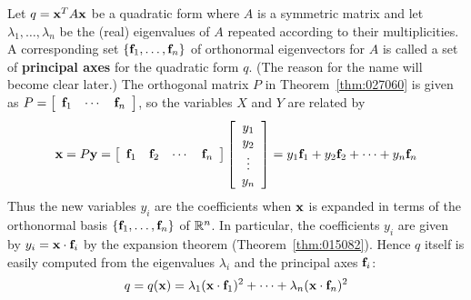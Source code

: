 Let $q = \textbf{x}^{T}A\textbf{x}$ be a quadratic form where $A$ is a symmetric matrix and let $\lambda_{1}, \dots, \lambda_{n}$ be the (real) eigenvalues of $A$ repeated according to their multiplicities. A corresponding set $\{\textbf{f}_{1}, \dots, \textbf{f}_{n}\}$ of orthonormal eigenvectors for $A$ is called a set of \textbf{principal axes} for the quadratic form $q$. (The reason for the name will become clear later.) The orthogonal matrix $P$ in Theorem~\ref{thm:027060} is given as $P = \left[ \begin{array}{ccc} \textbf{f}_{1} & \cdots & \textbf{f}_{n} \end{array} \right]$, so the variables $X$ and $Y$ are related by
\begin{equation*}
\textbf{x} = P\textbf{y} = \left[ \begin{array}{cccc}
\textbf{f}_{1} & \textbf{f}_{2}& \cdots & \textbf{f}_{n} 
\end{array}\right] \left[ \begin{array}{c}
y_{1} \\
y_{2} \\
\vdots \\
y_{n}
\end{array}\right] = y_{1}\textbf{f}_{1} + y_{2}\textbf{f}_{2} + \cdots + y_{n}\textbf{f}_{n}
\end{equation*}
Thus the new variables $y_{i}$ are the coefficients when $\textbf{x}$ is expanded in terms of the orthonormal basis $\{\textbf{f}_{1}, \dots, \textbf{f}_{n}\}$ of $\mathbb{R}^n$. In particular, the coefficients $y_{i}$ are given by $y_{i} = \textbf{x} \cdot \textbf{f}_{i}$ by the expansion theorem (Theorem~\ref{thm:015082}). Hence $q$ itself is easily computed from the eigenvalues $\lambda_{i}$ and the principal axes $\textbf{f}_{i}$:
\begin{equation*}
q = q(\textbf{x}) = \lambda_{1}(\textbf{x} \cdot \textbf{f}_{1})^2 + \cdots + \lambda_{n}(\textbf{x} \cdot \textbf{f}_{n})^2
\end{equation*}
